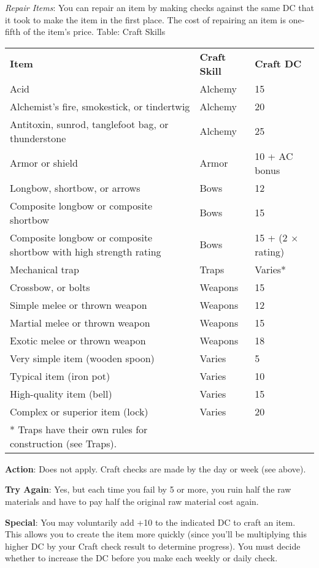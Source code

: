 \textit{Repair Items}: You can repair an item by making checks against the same DC that it took to make the item in the first place. The cost of repairing an item is one-fifth of the item's price.
				Table: Craft Skills
\begin{table}
\sffamily
 \begin{tabular}{lll}
  \textbf{Item} & \textbf{Craft Skill} & \textbf{Craft DC}\\
Acid & Alchemy & 15\\
Alchemist's fire, smokestick, or tindertwig & Alchemy & 20\\
Antitoxin, sunrod, tanglefoot bag, or thunderstone & Alchemy & 25\\
Armor or shield & Armor & 10 + AC bonus\\
Longbow, shortbow, or arrows & Bows & 12\\
Composite longbow or composite shortbow & Bows & 15\\
Composite longbow or composite shortbow with high strength rating & Bows & 15 + (2 \mbox{$\times$} rating)\\
Mechanical trap & Traps & Varies*\\
Crossbow, or bolts & Weapons & 15\\
Simple melee or thrown weapon& Weapons & 12\\
Martial melee or thrown weapon & Weapons & 15\\
Exotic melee or thrown weapon & Weapons & 18\\
Very simple item (wooden spoon) & Varies & 5\\
Typical item (iron pot) & Varies & 10\\
High-quality item (bell) & Varies & 15\\
Complex or superior item (lock) & Varies & 20\\
* Traps have their own rules for construction (see Traps).
 \end{tabular}
\end{table}
		
\textbf{Action}: Does not apply. Craft checks are made by the day or week (see above).
				
\textbf{Try Again}: Yes, but each time you fail by 5 or more, you ruin half the raw materials and have to pay half the original raw material cost again.
				
\textbf{Special}: You may voluntarily add +10 to the indicated DC to craft an item. This allows you to create the item more quickly (since you'll be multiplying this higher DC by your Craft check result to determine progress). You must decide whether to increase the DC before you make each weekly or daily check.
				
